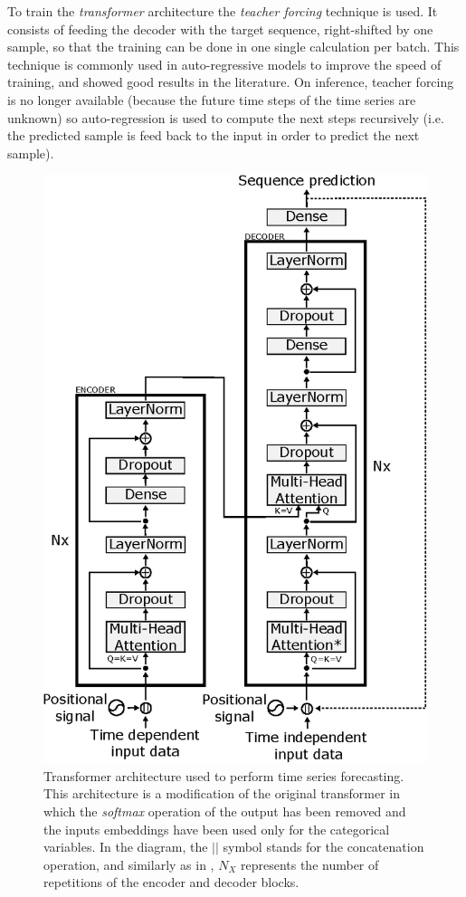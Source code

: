 \documentclass{elsarticle}
\begin{document}
	To train the \textit{transformer} architecture the \textit{teacher forcing} technique \cite{williams1989, goyal2016} is used. It consists of feeding the decoder with the target sequence, right-shifted by one sample, so that the training can be done in one single calculation per batch. This technique is commonly used in auto-regressive models to improve the speed of training, and showed good results in the literature. On inference, teacher forcing is no longer available (because the future time steps of the time series are unknown) so auto-regression is used to compute the next steps recursively (i.e. the predicted sample is feed back to the input in order to predict the next sample).
    
    \begin{figure}[h!]
    	\centering
    	\includegraphics[width=0.7\linewidth]{img/transformer}
    	\caption{Transformer architecture used to perform time series forecasting. This architecture is a modification of the original transformer in which the \textit{softmax} operation of the output has been removed and the inputs embeddings have been used only for the categorical variables. In the diagram, the $||$ symbol stands for the concatenation operation, and similarly as in \cite{vaswani2017}, $N_X$ represents the number of repetitions of the encoder and decoder blocks.}
    	\label{fig:transformer}
    \end{figure}
    
\end{document}
